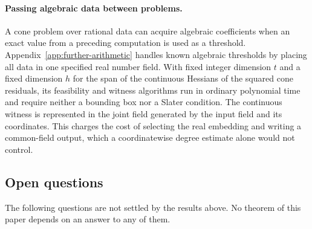 \paragraph{Passing algebraic data between problems.}
A cone problem over rational data can acquire algebraic coefficients when an
exact value from a preceding computation is used as a threshold.
Appendix~\ref{app:further-arithmetic} handles known algebraic thresholds by
placing all data in one specified real number field. With fixed integer
dimension $t$ and a fixed dimension $h$ for the span of the continuous
Hessians of the squared cone residuals, its feasibility and
witness algorithms run in ordinary polynomial time and require neither a
bounding box nor a Slater condition. The continuous witness is represented
in the joint field generated by the input field and its coordinates. This
charges the cost of selecting the real embedding and writing a common-field
output, which a coordinatewise degree estimate alone would not control.

\subsection{Open questions}
\label{sec:discussion-open}

The following questions are not settled by the results above. No theorem of
this paper depends on an answer to any of them.

